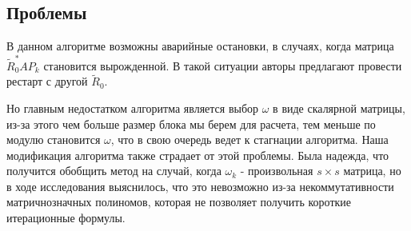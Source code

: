 \subsection{Проблемы}
\par В данном алгоритме возможны аварийные остановки, в случаях, когда матрица $\tilde{R}_0^*AP_k$ становится
вырожденной. В такой ситуации авторы \cite{elGuennouni2003} предлагают провести рестарт с другой $\tilde{R}_0$.
\par Но главным недостатком алгоритма \cite{elGuennouni2003} является выбор $\omega$
в виде скалярной матрицы, из-за этого чем больше размер блока мы берем
для расчета, тем меньше по модулю становится $\omega$, что в свою очередь ведет к стагнации алгоритма.
Наша модификация алгоритма также страдает от этой проблемы. Была надежда, что 
получится обобщить метод на случай, когда $\omega_k$ - произвольная $s \times s$ 
матрица, но в ходе исследования выяснилось, что это невозможно из-за некоммутативности 
матричнозначных полиномов, которая не позволяет получить короткие итерационные формулы.  



\newpage
